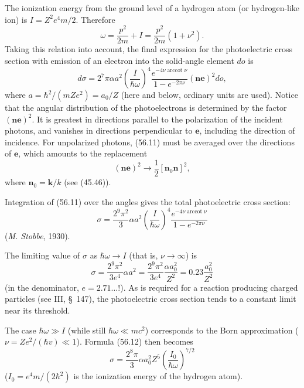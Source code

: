 The ionization energy from the ground level of a hydrogen atom (or hydrogen-like ion) is $I=Z^2e^4m/2$. Therefore
\begin{equation}
\omega=\frac{p^2}{2m}+I=\frac{p^2}{2m}(1+\nu^2).
\tag{56.10}
\end{equation}
Taking this relation into account, the final expression for the photoelectric cross section with emission of an electron into the solid-angle element $do$ is
\begin{equation}
d\sigma=2^7\pi\alpha a^2
\left(\frac I{\hbar\omega}\right)^{\!4}
\frac{e^{-4\nu\operatorname{arccot}\nu}}
{1-e^{-2\pi\nu}}(\mathbf n\mathbf e)^2do,
\tag{56.11}
\end{equation}
where $a=\hbar^2/(mZe^2)=a_0/Z$ (here and below, ordinary units are used). Notice that the angular distribution of the photoelectrons is determined by the factor $(\mathbf n\mathbf e)^2$. It is greatest in directions parallel to the polarization of the incident photons, and vanishes in directions perpendicular to $\mathbf e$, including the direction of incidence. For unpolarized photons, (56.11) must be averaged over the directions of $\mathbf e$, which amounts to the replacement
\[
(\mathbf n\mathbf e)^2\to\frac12[\mathbf n_0\mathbf n]^2,
\]
where $\mathbf n_0=\mathbf k/k$ (see (45.46)).

Integration of (56.11) over the angles gives the total photoelectric cross section:
\begin{equation}
\sigma=\frac{2^9\pi^2}{3}\alpha a^2
\left(\frac I{\hbar\omega}\right)^{\!4}
\frac{e^{-4\nu\operatorname{arccot}\nu}}
{1-e^{-2\pi\nu}}
\tag{56.12}
\end{equation}
(\emph{M. Stobbe}, 1930).

The limiting value of $\sigma$ as $\hbar\omega\to I$ (that is, $\nu\to\infty$) is
\begin{equation}
\sigma=\frac{2^9\pi^2}{3e^4}\alpha a^2
=\frac{2^9\pi^2}{3e^4}\frac{\alpha a_0^2}{Z^2}
=0{.}23\frac{a_0^2}{Z^2}
\tag{56.13}
\end{equation}
(in the denominator, $e=2{.}71\ldots$!). As is required for a reaction producing charged particles (see III, \S~147), the photoelectric cross section tends to a constant limit near its threshold.

The case $\hbar\omega\gg I$ (while still $\hbar\omega\ll mc^2$) corresponds to the Born approximation ($\nu=Ze^2/(\hbar v)\ll1$). Formula (56.12) then becomes
\begin{equation}
\sigma=\frac{2^8\pi}{3}\alpha a_0^2Z^5
\left(\frac{I_0}{\hbar\omega}\right)^{\!7/2}
\tag{56.14}
\end{equation}
($I_0=e^4m/(2\hbar^2)$ is the ionization energy of the hydrogen atom).


